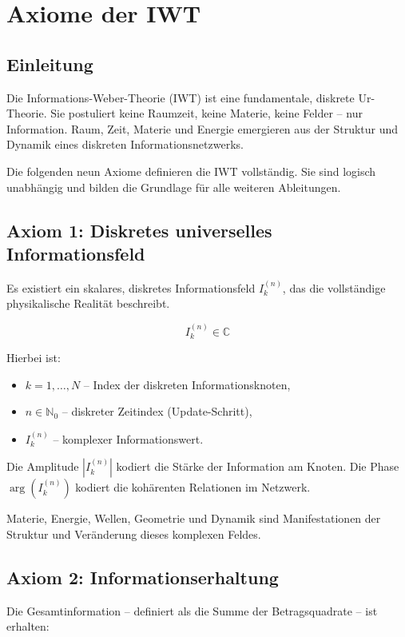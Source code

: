 \chapter{Axiome der IWT}

\section{Einleitung}

Die Informations-Weber-Theorie (IWT) ist eine fundamentale, diskrete Ur-Theorie. Sie postuliert keine Raumzeit, keine Materie, keine Felder – nur Information. Raum, Zeit, Materie und Energie emergieren aus der Struktur und Dynamik eines diskreten Informationsnetzwerks.

Die folgenden neun Axiome definieren die IWT vollständig. Sie sind logisch unabhängig und bilden die Grundlage für alle weiteren Ableitungen.

\section{Axiom 1: Diskretes universelles Informationsfeld}

Es existiert ein skalares, diskretes Informationsfeld \( I_k^{(n)} \), das die vollständige physikalische Realität beschreibt.

\[
I_k^{(n)} \in \mathbb{C}
\]

Hierbei ist:
\begin{itemize}
\item \( k = 1, \dots, N \) – Index der diskreten Informationsknoten,
\item \( n \in \mathbb{N}_0 \) – diskreter Zeitindex (Update-Schritt),
\item \( I_k^{(n)} \) – komplexer Informationswert.
\end{itemize}

Die Amplitude \( |I_k^{(n)}| \) kodiert die Stärke der Information am Knoten. Die Phase \( \arg(I_k^{(n)}) \) kodiert die kohärenten Relationen im Netzwerk.

Materie, Energie, Wellen, Geometrie und Dynamik sind Manifestationen der Struktur und Veränderung dieses komplexen Feldes.

\section{Axiom 2: Informationserhaltung}

Die Gesamtinformation – definiert als die Summe der Betragsquadrate – ist erhalten:

